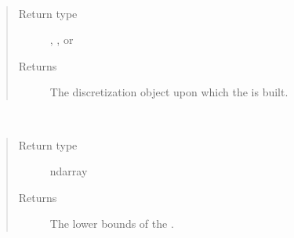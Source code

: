 \documentclass[letterpaper,10pt,english]{sphinxmanual}
\begin{document}
\begin{fulllineitems}
\begin{fulllineitems}
\end{fulllineitems}


\begin{fulllineitems}
\label{\detokenize{field:ESMF.api.field.Field.grid}}~\begin{quote}\begin{description}
\item[{Return type}] \leavevmode
{\hyperref[\detokenize{grid:ESMF.api.grid.Grid}]{}}, {\hyperref[\detokenize{mesh:ESMF.api.mesh.Mesh}]{}}, or
{\hyperref[\detokenize{locstream:ESMF.api.locstream.LocStream}]{}}

\item[{Returns}] \leavevmode
The discretization object upon which the
{\hyperref[\detokenize{field:ESMF.api.field.Field}]{}} is built.

\end{description}\end{quote}

\end{fulllineitems}


\begin{fulllineitems}
\label{\detokenize{field:ESMF.api.field.Field.lower_bounds}}~\begin{quote}\begin{description}
\item[{Return type}] \leavevmode
ndarray

\item[{Returns}] \leavevmode
The lower bounds of the {\hyperref[\detokenize{field:ESMF.api.field.Field}]{}}.

\end{description}\end{quote}

\end{fulllineitems}


\end{fulllineitems}
\end{document}
